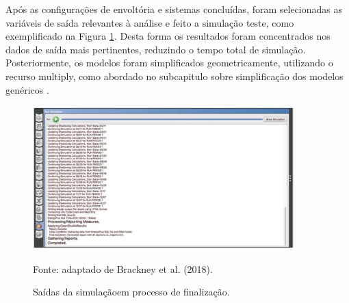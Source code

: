 \noindent Após as configurações de envoltória e sistemas concluídas, foram selecionadas as variáveis de saída relevantes à análise e feito a simulação teste, como exemplificado na Figura \ref{fig:figure19}. Desta forma os resultados foram concentrados nos dados de saída mais pertinentes, reduzindo o tempo total de simulação. Posteriormente, os modelos foram simplificados geometricamente, utilizando o recurso multiply, como abordado no subcapitulo sobre simplificação dos modelos genéricos \cite{Brackney2018}.\newline
\begin{figure}[H]
    \centering
    \caption{Saídas da simulaçãoem processo de finalização.}
    \includegraphics[width=0.9\textwidth]{figures/fig19-OS4.png}
    \begin{flushleft}
        \par \small Fonte: adaptado de Brackney et al. (2018).
    \end{flushleft}
    \label{fig:figure19}
\end{figure}